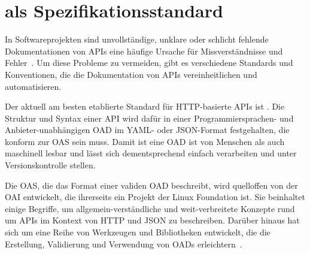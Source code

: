 \chapter{\OA als Spezifikationsstandard} \label{ch:openapi}
In Softwareprojekten sind unvollständige, unklare oder schlicht fehlende Dokumentationen von \acp{API} eine häufige Ursache für Missverständnisse und Fehler~\cite{ope23a}.
Um diese Probleme zu vermeiden, gibt es verschiedene Standards und Konventionen, die die Dokumentation von \acp{API} vereinheitlichen und automatisieren.

Der aktuell am besten etablierte Standard für \ac{HTTP}-basierte \acp{API} ist \OA.
Die Struktur und Syntax einer \ac{API} wird dafür in einer Programmiersprachen- und Anbieter-unabhängigen \ac{OAD} im \acs{YAML}- oder \acs{JSON}-Format festgehalten, die konform zur \ac{OAS} sein muss.
Damit ist eine \ac{OAD} ist von Menschen als auch maschinell lesbar und lässt sich dementsprechend  einfach verarbeiten und unter Versionskontrolle stellen.

Die \ac{OAS}, die das Format einer validen \ac{OAD} beschreibt, wird quelloffen von der \ac{OAI} entwickelt, die ihrerseits ein Projekt der Linux Foundation ist.
Sie beinhaltet einige Begriffe, um allgemein-verständliche und weit-verbreitete Konzepte rund um \acp{API} im Kontext von \acs{HTTP} und \acs{JSON} zu beschreiben.
Darüber hinaus hat sich um \OA eine Reihe von Werkzeugen und Bibliotheken entwickelt, die die Erstellung, Validierung und Verwendung von \acp{OAD} erleichtern~\cites{ope,ope23,ope23a}.

